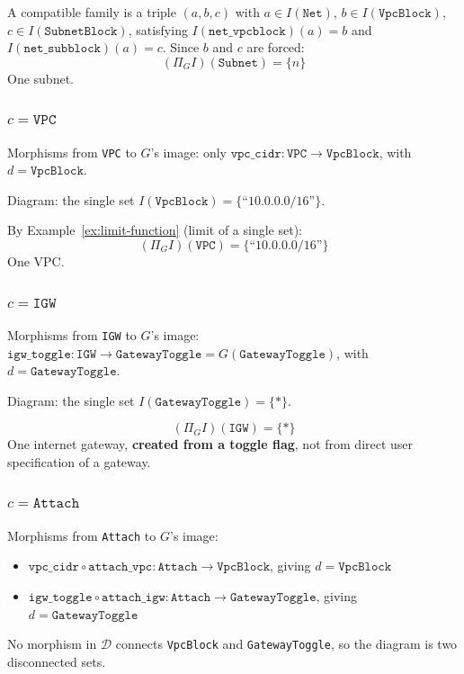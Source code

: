 \documentclass[11pt,a4paper]{article}
\theoremstyle{definition}
\theoremstyle{plain}
\begin{document}
A compatible family is a triple $(a, b, c)$ with $a \in I(\texttt{Net})$, $b \in I(\texttt{VpcBlock})$, $c \in I(\texttt{SubnetBlock})$, satisfying $I(\texttt{net\_vpcblock})(a) = b$ and $I(\texttt{net\_subblock})(a) = c$. Since $b$ and $c$ are forced:
\[
(\Pi_G I)(\texttt{Subnet}) = \{n\}
\]
One subnet.

\subsubsection*{$c = \texttt{VPC}$}

Morphisms from \texttt{VPC} to $G$'s image: only $\texttt{vpc\_cidr} \colon \texttt{VPC} \to \texttt{VpcBlock}$, with $d = \texttt{VpcBlock}$.

Diagram: the single set $I(\texttt{VpcBlock}) = \{\text{``10.0.0.0/16''}\}$.

By Example~\ref{ex:limit-function} (limit of a single set):
\[
(\Pi_G I)(\texttt{VPC}) = \{\text{``10.0.0.0/16''}\}
\]
One VPC.

\subsubsection*{$c = \texttt{IGW}$}

Morphisms from \texttt{IGW} to $G$'s image: $\texttt{igw\_toggle} \colon \texttt{IGW} \to \texttt{GatewayToggle} = G(\texttt{GatewayToggle})$, with $d = \texttt{GatewayToggle}$.

Diagram: the single set $I(\texttt{GatewayToggle}) = \{*\}$.

\[
(\Pi_G I)(\texttt{IGW}) = \{*\}
\]
One internet gateway, \textbf{created from a toggle flag}, not from direct user specification of a gateway.

\subsubsection*{$c = \texttt{Attach}$}

Morphisms from \texttt{Attach} to $G$'s image:
\begin{itemize}
  \item $\texttt{vpc\_cidr} \circ \texttt{attach\_vpc} \colon \texttt{Attach} \to \texttt{VpcBlock}$, giving $d = \texttt{VpcBlock}$
  \item $\texttt{igw\_toggle} \circ \texttt{attach\_igw} \colon \texttt{Attach} \to \texttt{GatewayToggle}$, giving $d = \texttt{GatewayToggle}$
\end{itemize}

No morphism in $\mathcal{D}$ connects \texttt{VpcBlock} and \texttt{GatewayToggle}, so the diagram is two disconnected sets.
\end{document}
